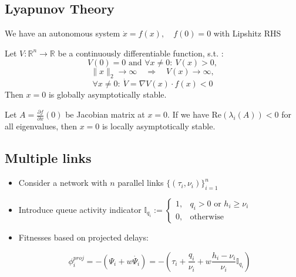\documentclass[10pt]{beamer}
\begin{document}
\begin{frame}

\subsection*{Lyapunov Theory}

We have an autonomous system $ \dot{x} = f(x), \quad f(0) = 0$ with Lipshitz RHS


\begin{theorem}
Let $V: \mathbb{R}^n \to \mathbb{R}$ be a continuously differentiable function, s.t. :
$$V(0) = 0 \text{ and } \forall x \neq 0: ~V(x) > 0  , $$
$$ \lVert x \rVert_2 \to \infty \quad \Rightarrow \quad V(x) \to \infty, $$
$$ \forall x \neq 0 :  ~\dot{V} =  \nabla V(x) \cdot f(x) < 0 $$
Then $x = 0$ is globally asymptotically stable.
\end{theorem}

\begin{theorem}
Let $A = \frac{\partial f}{\partial x}(0)$ be Jacobian matrix at $x=0$. If we have $\mathrm{Re} (\lambda_i(A)) < 0$ for all eigenvalues, then $x = 0$ is locally asymptotically stable.

\end{theorem}

\end{frame}

\subsection{Multiple links}

\begin{frame}

\begin{itemize}

\item Consider a network with $n$ parallel links $\{(\tau_i, \nu_i)\}_{i=1}^n$


\item Introduce queue activity indicator $ \mathbb{I}_{q_i} := \begin{cases} 1, & q_i > 0 \text{ or }  h_i \geq \nu_i \\ 0, & \text{otherwise} \end{cases} $ 

\item Fitnesses based on projected delays:

$$ \phi^{proj}_i = - ( \Psi_i + w \dot{\Psi_i} ) = -\left( \tau_i + \frac{q_i}{\nu_i} + w \frac{h_i - \nu_i}{\nu_i} \mathbb{I}_{q_i} \right) $$

\end{itemize}

\end{frame}
\end{document}
